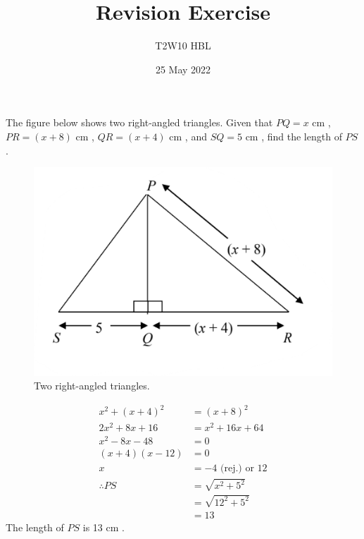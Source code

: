 \documentclass[12pt,answers]{exam}
\title{Revision Exercise}
\author{T2W10 HBL}
\date{25 May 2022}
\newcommand{\cm}{\si{\centi\metre} }
\begin{document}
\maketitle

\begin{questions}

\question The figure below shows two right-angled triangles.
Given that \(PQ = x\) \cm, \(PR = (x + 8)\) \cm, \(QR = (x + 4)\) \cm,
and \(SQ = 5\) \cm, find the length of \(PS\).

\begin{figure}[htpb]
	\centering
	\includegraphics{tri.png}
	\caption{Two right-angled triangles.}
	\label{fig:tri}
\end{figure}

\begin{solution}
\begin{align*}
	x^2 + (x + 4)^2 &= (x + 8)^2 \\
	2x^2 + 8x + 16 &= x^2 + 16x + 64 \\
	x^2 - 8x - 48 &= 0 \\
	(x + 4)(x - 12) &= 0 \\
	x &= -4 \text{ (rej.) or } 12 \\
	\therefore PS &= \sqrt{x^2 + 5^2} \\
	&= \sqrt{12^2 + 5^2} \\
	&= 13
\end{align*}
The length of \(PS\) is 13 \cm.
\end{solution}


\end{questions}
\end{document}
